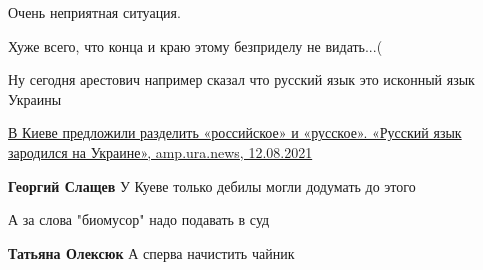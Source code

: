 \begin{itemize}
Очень неприятная ситуация.

Хуже всего, что конца и краю этому безприделу не видать...(

\begin{itemize}
 
Ну сегодня арестович например сказал что русский язык это исконный язык Украины

 

\href{https://amp.ura.news/news/1052498954}{%
В Киеве предложили разделить «российское» и «русское». «Русский язык зародился на Украине», amp.ura.news, 12.08.2021%
}

 
\textbf{Георгий Слащев} У Куеве только дебилы могли додумать до этого

\end{itemize}

 
А за слова "биомусор" надо подавать в суд

\begin{itemize}
 
\textbf{Татьяна Олексюк} А сперва начистить чайник
\end{itemize}

 


\end{itemize}
